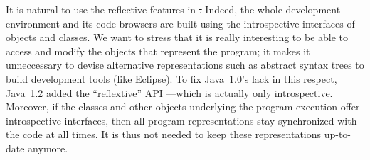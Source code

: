 \documentclass[a4paper,10pt,twoside]{book}
\begin{document}
It is natural to use the reflective features in \st.
Indeed, the whole development environment and its code browsers are built using the introspective interfaces of objects and classes.
We want to stress that it is really interesting to be able to access and modify the objects that represent the program; it makes it unneccessary to devise alternative representations such as abstract syntax trees to build development tools (like Eclipse).
To fix Java~1.0's lack in this respect, Java~1.2 added the ``reflextive'' API ---which is actually only introspective.
Moreover, if the classes and other objects underlying the program execution offer introspective interfaces, then all program representations stay synchronized with the code at all times.
It is thus not needed to keep these representations up-to-date anymore.



\ifx\wholebook\relax\else
\end{document}
